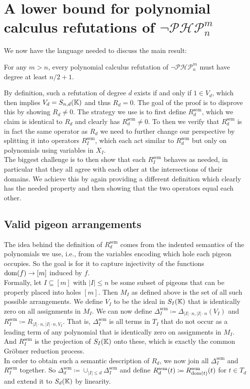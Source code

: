\documentclass{article}
\newcommand{\Snd}{S_{n, d}(\KK)}
\newcommand{\PHP}{\ensuremath{\neg \mathcal{PHP}^m_n}\xspace}
\newcommand{\Rsem}{R^\mathrm{sem}}
\newcommand{\Dsem}{\Delta^\mathrm{sem}}
\begin{document}
\section{A lower bound for polynomial calculus refutations of \texorpdfstring{\PHP}{PHP}}
We now have the language needed to discuss the main result:
\begin{theorem} \label{main}
    For any $m > n$, every polynomial calculus refutation of \PHP must have degree at least $n/2 + 1$.
\end{theorem}
By definition, such a refutation of degree $d$ exists if and only if $1 \in V_d$, which then implies $V_d = \Snd$ and thus $R_d = 0$. The goal of the proof is to disprove this by showing $R_d \neq 0$. The strategy we use is to first define $\Rsem_d$, which we claim is identical to $R_d$ and clearly has $\Rsem_d \neq 0$. To then we verify that $\Rsem_d$ is in fact the same operator as $R_d$ we need to further change our perspective by splitting it into operators $\Rsem_I$, which each act similar to $\Rsem_d$ but only on polynomials using variables in $X_I$.\\
The biggest challenge is to then show that each $\Rsem_I$ behaves as needed, in particular that they all agree with each other at the intersections of their domains. We achieve this by again providing a different definition which clearly has the needed property and then showing that the two operators equal each other.

\subsection{Valid pigeon arrangements}
The idea behind the definition of $\Rsem_d$ comes from the indented semantics of the polynomials we use, i.e., from the variables encoding which hole each pigeon occupies. So the goal is for it to capture injectivity of the functions $\operatorname{dom}(f) \to [m]$ induced by $f$.\\
Formally, let $I \subseteq [m]$ with $|I| \leq n$ be some subset of pigeons that can be properly placed into holes $[m]$. Then $M_I$ as defined above is the set of all such possible arrangements. We define $V_I$ to be the ideal in $S_I(\mathbb{K})$ that is identically zero on all assignments in $M_I$. We can now define $\Dsem_I \coloneqq \Delta_{|I| \cdot n, |I| \cdot n}(V_I)$ and $\Rsem_I \coloneqq R_{|I| \cdot n, |I| \cdot n, V_I}$. That is, $\Dsem_I$ is all terms in $T_I$ that do not occur as a leading term of any polynomial that is identically zero on assignments in $M_I$. And $\Rsem_I$ is the projection of $S_I(\mathbb{K})$ onto these, which is exactly the common Gröbner reduction process.\\
In order to obtain such a semantic description of $R_d$, we now join all $\Dsem_I$ and $\Rsem_I$ together. So $\Dsem_d \coloneqq \cup_{|I| \leq d} \Dsem_I$ and define $\Rsem_d(t) \coloneqq \Rsem_{\dom(t)}(t)$ for $t \in T_d$ and extend it to $S_d(\mathbb{K})$ by linearity.
\end{document}
